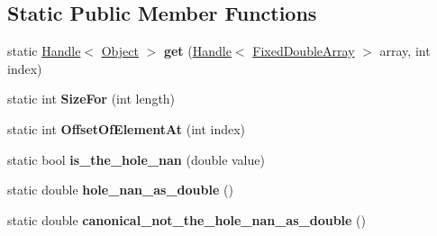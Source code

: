 \subsection*{Static Public Member Functions}
\begin{DoxyCompactItemize}
\item 
\hypertarget{classv8_1_1internal_1_1_fixed_double_array_aeb86d79f163a49529a1b37594682d9dd}{}static \hyperlink{classv8_1_1internal_1_1_handle}{Handle}$<$ \hyperlink{classv8_1_1internal_1_1_object}{Object} $>$ {\bfseries get} (\hyperlink{classv8_1_1internal_1_1_handle}{Handle}$<$ \hyperlink{classv8_1_1internal_1_1_fixed_double_array}{Fixed\+Double\+Array} $>$ array, int index)\label{classv8_1_1internal_1_1_fixed_double_array_aeb86d79f163a49529a1b37594682d9dd}

\item 
\hypertarget{classv8_1_1internal_1_1_fixed_double_array_ad43d5cfebc4805de874b189cf2c94055}{}static int {\bfseries Size\+For} (int length)\label{classv8_1_1internal_1_1_fixed_double_array_ad43d5cfebc4805de874b189cf2c94055}

\item 
\hypertarget{classv8_1_1internal_1_1_fixed_double_array_aea74d64b36ea2275796e59287e418316}{}static int {\bfseries Offset\+Of\+Element\+At} (int index)\label{classv8_1_1internal_1_1_fixed_double_array_aea74d64b36ea2275796e59287e418316}

\item 
\hypertarget{classv8_1_1internal_1_1_fixed_double_array_a66a1f24312fad593c80f7927faad8abd}{}static bool {\bfseries is\+\_\+the\+\_\+hole\+\_\+nan} (double value)\label{classv8_1_1internal_1_1_fixed_double_array_a66a1f24312fad593c80f7927faad8abd}

\item 
\hypertarget{classv8_1_1internal_1_1_fixed_double_array_a2fa074e014854280c345f85fb4bdb85a}{}static double {\bfseries hole\+\_\+nan\+\_\+as\+\_\+double} ()\label{classv8_1_1internal_1_1_fixed_double_array_a2fa074e014854280c345f85fb4bdb85a}

\item 
\hypertarget{classv8_1_1internal_1_1_fixed_double_array_a1ba16717f43f27f13f1a9708098d03c8}{}static double {\bfseries canonical\+\_\+not\+\_\+the\+\_\+hole\+\_\+nan\+\_\+as\+\_\+double} ()\label{classv8_1_1internal_1_1_fixed_double_array_a1ba16717f43f27f13f1a9708098d03c8}

\end{DoxyCompactItemize}
